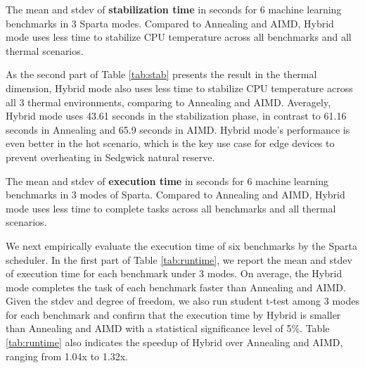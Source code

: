 
\begin{table}[t]
\caption{The mean and stdev of \textbf{stabilization time} in seconds for 6 machine learning benchmarks in 3 Sparta modes. Compared to Annealing and AIMD, Hybrid mode uses less time to stabilize CPU temperature across all benchmarks and all thermal scenarios. }\label{tab:stab}
\vspace{1mm}
\centering
\resizebox{350pt}{!}{}
\newline
\vspace{3mm}
\newline
\resizebox{300pt}{!}{}
\end{table}




As the second part of Table \ref{tab:stab} presents the result in the thermal dimension, Hybrid mode also uses less time to stabilize CPU temperature across all 3 thermal environments, comparing to Annealing and AIMD. Averagely, Hybrid mode uses 43.61 seconds in the stabilization phase, in contrast to 61.16 seconds in Annealing and 65.9 seconds in AIMD. Hybrid mode's performance is even better in the hot scenario, which is the key use case for edge devices to prevent overheating in Sedgwick natural reserve.

\begin{table}[t]
\caption{The mean and stdev of \textbf{execution time} in seconds for 6 machine learning benchmarks in 3 modes of Sparta. Compared to Annealing and AIMD, Hybrid mode uses less time to complete tasks across all benchmarks and all thermal scenarios. }\label{tab:runtime}
\vspace{1mm}
\centering
\resizebox{350pt}{!}{}
\newline
\vspace{3mm}
\newline
\resizebox{300pt}{!}{}
\end{table}


We next empirically evaluate the execution time of six benchmarks by the Sparta scheduler. In the first part of Table \ref{tab:runtime}, we report the mean and stdev of execution time for each benchmark under 3 modes. On average, the Hybrid mode completes the task of each benchmark faster than Annealing and AIMD. Given the stdev and degree of freedom, we also run student t-test among 3 modes for each benchmark and confirm that the execution time by Hybrid is smaller than Annealing and AIMD with a statistical significance level of 5\%. Table \ref{tab:runtime} also indicates the speedup of Hybrid over Annealing and AIMD, ranging from 1.04x to 1.32x. 

